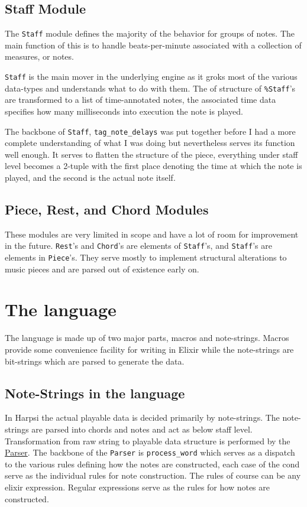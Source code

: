 \documentclass[11pt]{article}
\begin{document}
\subsection{Staff Module}
\label{sec-2-2}
The \verb~Staff~ module defines the majority of the behavior for groups
of notes. The main function of this is to handle beats-per-minute
associated with a collection of measures, or notes.

\verb~Staff~ is the main mover in the underlying engine as it groks most
of the various data-types and understands what to do with
them. The of structure of \verb~%Staff~'s are transformed to
a list of time-annotated notes, the associated time data specifies
how many milliseconds into execution the note is played.

The backbone of \texttt{Staff}, \texttt{tag\_note\_delays} was put together before
I had a more complete understanding of what I was doing but
nevertheless serves its function well enough. It serves to flatten
the structure of the piece, everything under staff level becomes a
2-tuple with the first place denoting the time at which the note is
played, and the second is the actual note itself.

\subsection{Piece, Rest, and Chord Modules}
\label{sec-2-3}
These modules are very limited in scope and have a lot of room for
improvement in the future. \texttt{Rest}'s and \texttt{Chord}'s are elements of
\texttt{Staff}'s, and \texttt{Staff}'s are elements in \texttt{Piece}'s. They serve
mostly to implement structural alterations to music pieces and are
parsed out of existence early on.

\section{The language}
\label{sec-3}
The language is made up of two major parts, macros and
note-strings. Macros provide some convenience facility for writing
in Elixir while the note-strings are bit-strings which are parsed to
generate the data.

\subsection{Note-Strings in the language}
\label{sec-3-1}
In Harpsi the actual playable data is decided primarily by
note-strings. The note-strings are parsed into chords and notes and
act as below staff level. Transformation from raw string to
playable data structure is performed by the \href{lib/parser.ex}{Parser}. The
backbone of the \verb~Parser~ is \verb~process_word~ which serves as a
dispatch to the various rules defining how the notes are
constructed, each case of the cond serve as the individual rules
for note construction. The rules of course can be any elixir
expression. Regular expressions serve as the rules for how notes
are constructed.
\end{document}
